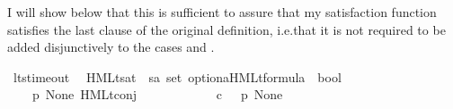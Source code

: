 \begin{isabellebody}
\begin{isamarkuptext}
I will show below that this is sufficient to assure that my satisfaction function satisfies the last clause of the original definition, i.e.\@ that it is not required to be added disjunctively to the cases  and .%
\end{isamarkuptext}\isamarkuptrue%
\isamarkupfalse%
\ lts{\isacharunderscore}{\kern0pt}timeout\ \isanewline
\isanewline
{}\isamarkupfalse%
\ HMLt{\isacharunderscore}{\kern0pt}sat\ {\isacharcolon}{\kern0pt}{\isacharcolon}{\kern0pt}\ {\isacartoucheopen}{\isacharprime}{\kern0pt}s{\isasymRightarrow}{\isacharprime}{\kern0pt}a\ set\ option{\isasymRightarrow}{\isacharparenleft}{\kern0pt}{\isacharprime}{\kern0pt}a{\isacharparenright}{\kern0pt}HMLt{\isacharunderscore}{\kern0pt}formula\ {\isasymRightarrow}\ bool{\isacartoucheclose}\ \isanewline
\ \ {\isacharparenleft}{\kern0pt}{\isacartoucheopen}{\isacharunderscore}{\kern0pt}\ {\isasymTTurnstile}{\isacharquery}{\kern0pt}{\isacharbrackleft}{\kern0pt}{\isacharunderscore}{\kern0pt}{\isacharbrackright}{\kern0pt}\ {\isacharunderscore}{\kern0pt}{\isacartoucheclose}\ {\isacharbrackleft}{\kern0pt}{}{}{\isacharcomma}{\kern0pt}\ {}{}{\isacharcomma}{\kern0pt}\ {}{}{\isacharbrackright}{\kern0pt}\ {}{}{\isacharparenright}{\kern0pt}\isanewline
\ \ \isanewline
\ \ \ \ {\isacartoucheopen}{\isacharparenleft}{\kern0pt}p\ {\isasymTTurnstile}{\isacharquery}{\kern0pt}{\isacharbrackleft}{\kern0pt}None{\isacharbrackright}{\kern0pt}\ {\isacharparenleft}{\kern0pt}HMLt{\isacharunderscore}{\kern0pt}conj\ {\isasymPhi}{\isacharparenright}{\kern0pt}{\isacharparenright}{\kern0pt}\ {\isacharequal}{\kern0pt}\ \isanewline
\ \ \ \ \ \ {\isacharparenleft}{\kern0pt}{\isasymforall}\ {\isasymphi}{\isachardot}{\kern0pt}\ {\isasymphi}\ {\isasymin}\isactrlsub c\ {\isasymPhi}\ {\isasymlongrightarrow}\ p\ {\isasymTTurnstile}{\isacharquery}{\kern0pt}{\isacharbrackleft}{\kern0pt}None{\isacharbrackright}{\kern0pt}\ {\isasymphi}{\isacharparenright}{\kern0pt}{\isacartoucheclose}\ \isanewline

\end{isabellebody}
